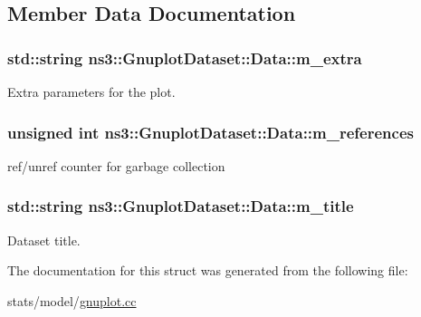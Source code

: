 \subsection{Member Data Documentation}
\subsubsection[{\texorpdfstring{m\+\_\+extra}{m_extra}}]{\setlength{\rightskip}{0pt plus 5cm}std\+::string ns3\+::\+Gnuplot\+Dataset\+::\+Data\+::m\+\_\+extra}\hypertarget{structns3_1_1GnuplotDataset_1_1Data_a25343752a00d9ed36df0d3996e177277}{}\label{structns3_1_1GnuplotDataset_1_1Data_a25343752a00d9ed36df0d3996e177277}


Extra parameters for the plot. 

\subsubsection[{\texorpdfstring{m\+\_\+references}{m_references}}]{\setlength{\rightskip}{0pt plus 5cm}unsigned int ns3\+::\+Gnuplot\+Dataset\+::\+Data\+::m\+\_\+references}\hypertarget{structns3_1_1GnuplotDataset_1_1Data_a0845a5e7822997fb866f592404798ffc}{}\label{structns3_1_1GnuplotDataset_1_1Data_a0845a5e7822997fb866f592404798ffc}


ref/unref counter for garbage collection 

\subsubsection[{\texorpdfstring{m\+\_\+title}{m_title}}]{\setlength{\rightskip}{0pt plus 5cm}std\+::string ns3\+::\+Gnuplot\+Dataset\+::\+Data\+::m\+\_\+title}\hypertarget{structns3_1_1GnuplotDataset_1_1Data_ab8c0e78c05f666aaf901794a1e2b06ab}{}\label{structns3_1_1GnuplotDataset_1_1Data_ab8c0e78c05f666aaf901794a1e2b06ab}


Dataset title. 



The documentation for this struct was generated from the following file\+:\begin{DoxyCompactItemize}
\item 
stats/model/\hyperlink{gnuplot_8cc}{gnuplot.\+cc}\end{DoxyCompactItemize}
